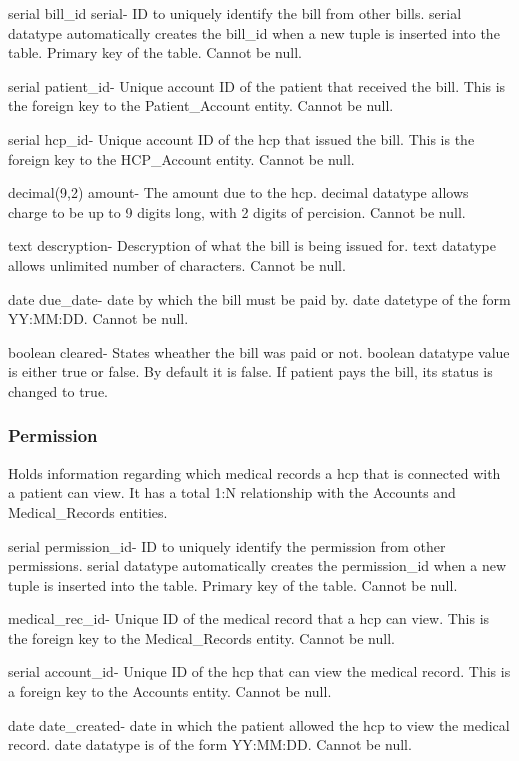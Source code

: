 \documentclass[12pt]{report}
\begin{document}
\begin{description}
\item serial bill\_id serial-  ID to uniquely identify the bill from other bills. serial datatype automatically creates the bill\_id when a new tuple is inserted into the table.  Primary key of the table.  Cannot be null.
\item serial patient\_id- Unique account ID of the patient that received the bill.  This is the foreign key to the Patient\_Account entity.  Cannot be null.
\item serial hcp\_id- Unique account ID of the hcp that issued the bill.  This is the foreign key to the HCP\_Account entity.  Cannot be null.
\item decimal(9,2) amount- The amount due to the hcp.  decimal datatype allows charge to be up to 9 digits long, with 2 digits of percision.  Cannot be null.
\item text descryption- Descryption of what the bill is being issued for.  text datatype allows unlimited number of characters. Cannot be null.
\item date due\_date- date by which the bill must be paid by.  date datetype of the form YY:MM:DD.  Cannot be null.
\item boolean cleared- States wheather the bill was paid or not.  boolean datatype value is either true or false.  By default it is false.  If patient pays the bill, its status is changed to true.
\end{description}

\subsubsection{Permission}
Holds information regarding which medical records a hcp that is connected with a patient can view.  It has a total 1:N relationship with the Accounts and Medical\_Records entities.

\begin{description}
\item serial permission\_id-  ID to uniquely identify the permission from other permissions. serial datatype automatically creates the permission\_id when a new tuple is inserted into the table.  Primary key of the table.  Cannot be null.
\item medical\_rec\_id- Unique ID of the medical record that a hcp can view.  This is the foreign key to the Medical\_Records entity.  Cannot be null.
\item serial account\_id- Unique ID of the hcp that can view the medical record.  This is a foreign key to the Accounts entity.  Cannot be null.
\item date date\_created-  date in which the patient allowed the hcp to view the medical record.  date datatype is of the form YY:MM:DD.  Cannot be null.
\end{description}
\end{document}
